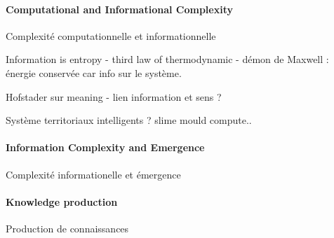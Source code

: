 \cite{2016arXiv161102269V}

\cite{vattay2015quantum}


\paragraph{Computational and Informational Complexity}{Complexité computationnelle et informationnelle}


Information is entropy - third law of thermodynamic - démon de Maxwell : énergie conservée car info sur le système.


Hofstader sur meaning - lien information et sens ?


Système territoriaux intelligents ? slime mould compute..


\paragraph{Information Complexity and Emergence}{Complexité informationelle et émergence}






\paragraph{Knowledge production}{Production de connaissances}
















